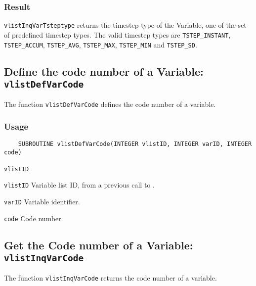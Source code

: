 \subsubsection*{Result}

{\texttt{vlistInqVarTsteptype}} returns the timestep type of the Variable,
one of the set of predefined {\CDI} timestep types.
The valid {\CDI} timestep types are {\texttt{TSTEP\_INSTANT}},
{\texttt{TSTEP\_ACCUM}}, {\texttt{TSTEP\_AVG}}, {\texttt{TSTEP\_MAX}}, {\texttt{TSTEP\_MIN}} and {\texttt{TSTEP\_SD}}.



\subsection{Define the code number of a Variable: \texttt{vlistDefVarCode}}
\label{vlistDefVarCode}

The function {\texttt{vlistDefVarCode}} defines the code number of a variable.

\subsubsection*{Usage}

\begin{verbatim}
    SUBROUTINE vlistDefVarCode(INTEGER vlistID, INTEGER varID, INTEGER code)
\end{verbatim}

\hspace*{4mm}\begin{minipage}[]{15cm}
\begin{deflist}{\texttt{vlistID}\ }
\item[\texttt{vlistID}]
Variable list ID, from a previous call to {}.
\item[\texttt{varID}]
Variable identifier.
\item[\texttt{code}]
Code number.

\end{deflist}
\end{minipage}


\subsection{Get the Code number of a Variable: \texttt{vlistInqVarCode}}
\label{vlistInqVarCode}

The function {\texttt{vlistInqVarCode}} returns the code number of a variable.

